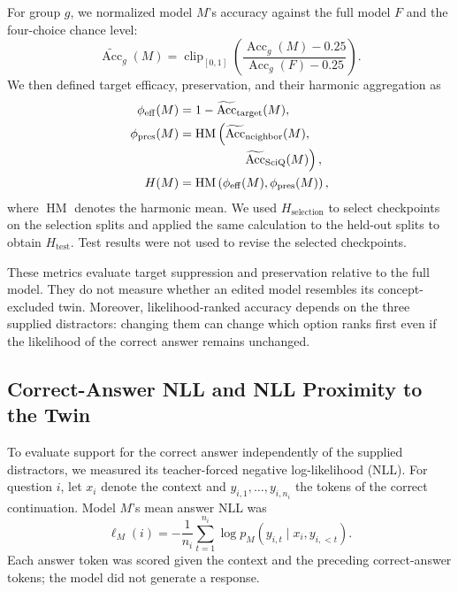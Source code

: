 For group $g$, we normalized model $M$'s accuracy against the full model $F$
and the four-choice chance level:
\begin{equation}
\widetilde{\operatorname{Acc}}_g(M)
=
\operatorname{clip}_{[0,1]}
\left(
\frac{\operatorname{Acc}_g(M)-0.25}
{\operatorname{Acc}_g(F)-0.25}
\right).
\end{equation}
We then defined target efficacy, preservation, and their harmonic aggregation
as
\begin{align}
\phi_{\mathrm{eff}}(M)
&=
1-\widetilde{\operatorname{Acc}}_{\mathrm{target}}(M),\\
\phi_{\mathrm{pres}}(M)
&=
\operatorname{HM}\left(
\widetilde{\operatorname{Acc}}_{\mathrm{neighbor}}(M),\right.\notag\\[-0.25ex]
&\hspace{5.1em}\left.
\widetilde{\operatorname{Acc}}_{\mathrm{SciQ}}(M)
\right),\\
H(M)
&=
\operatorname{HM}\left(
\phi_{\mathrm{eff}}(M),
\phi_{\mathrm{pres}}(M)
\right),
\end{align}
where $\operatorname{HM}$ denotes the harmonic mean. We used
$H_{\mathrm{selection}}$ to select checkpoints on the selection splits and
applied the same calculation to the held-out splits to obtain
$H_{\mathrm{test}}$. Test results were not used to revise the selected
checkpoints.

These metrics evaluate target suppression and preservation relative to the
full model. They do not measure whether an edited model resembles its
concept-excluded twin. Moreover, likelihood-ranked accuracy depends on the
three supplied distractors: changing them can change which option ranks first
even if the likelihood of the correct answer remains unchanged.

\subsection{Correct-Answer NLL and NLL Proximity to the Twin}

To evaluate support for the correct answer independently of the supplied
distractors, we measured its teacher-forced negative log-likelihood (NLL). For
question $i$, let $x_i$ denote the context and
$y_{i,1},\ldots,y_{i,n_i}$ the tokens of the correct continuation. Model $M$'s
mean answer NLL was
\begin{equation}
\ell_M(i)
=
-\frac{1}{n_i}
\sum_{t=1}^{n_i}
\log p_M(y_{i,t}\mid x_i,y_{i,<t}).
\end{equation}
Each answer token was scored given the context and the preceding correct-answer
tokens; the model did not generate a response.


